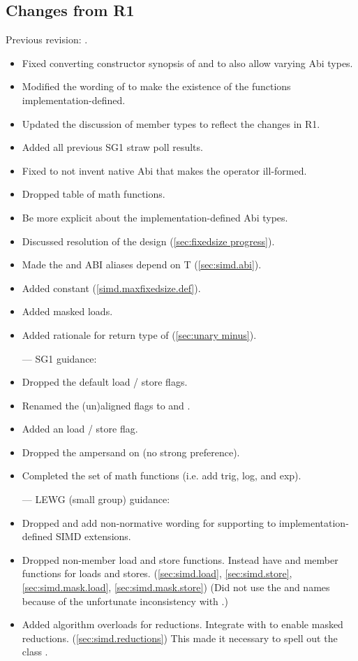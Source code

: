 \subsection{Changes from R1}
Previous revision: \parencite{P0214R1}.
\begin{itemize}
    \item Fixed converting constructor synopsis of \simd and \mask to also allow varying Abi types.
    \item Modified the wording of  to make the existence of the functions implementation-defined.
    \item Updated the discussion of member types to reflect the changes in R1.
    \item Added all previous SG1 straw poll results.
    \item Fixed  to not invent native Abi that makes the operator ill-formed.
    \item Dropped table of math functions.
    \item Be more explicit about the implementation-defined Abi types.
    \item Discussed resolution of the \fixedsizeN design (\ref{sec:fixedsize progress}).
    \item Made the  and  ABI aliases depend on \type T (\ref{sec:simd.abi}).
    \item Added  constant (\ref{simd.maxfixedsize.def}).
    \item Added masked loads.
    \item Added rationale for return type of \simd[::operator-()] (\ref{sec:unary minus}).
  \color{black}\item[---] SG1 guidance:
    \item Dropped the default load / store flags.
    \item Renamed the (un)aligned flags to  and .
    \item Added an  load / store flag.
    \item Dropped the ampersand on  (no strong preference).
    \item Completed the set of math functions (i.e. add trig, log, and exp).
  \color{black}\item[---] LEWG (small group) guidance:
    \item Dropped  and add non-normative wording for supporting  to implementation-defined SIMD extensions.
    \item Dropped non-member load and store functions.
    Instead have  and  member functions for loads and stores. (\ref{sec:simd.load}, \ref{sec:simd.store}, \ref{sec:simd.mask.load}, \ref{sec:simd.mask.store})
    (Did not use the  and  names because of the unfortunate inconsistency with \std{}.)
    \item Added algorithm overloads for \simd reductions.
    Integrate with  to enable masked reductions. (\ref{sec:simd.reductions})
    This made it necessary to spell out the class .
\end{itemize}
